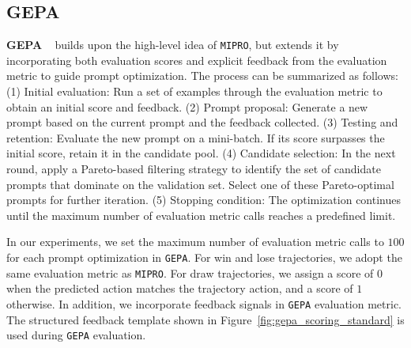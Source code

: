 


\subsection{GEPA} \label{app:baseline:gepa}
\textbf{GEPA} ~\citep{agrawal2025gepa} builds upon the high-level idea of \texttt{MIPRO}, but extends it by incorporating both evaluation scores and explicit feedback from the evaluation metric to guide prompt optimization. The process can be summarized as follows: (1) Initial evaluation: Run a set of examples through the evaluation metric to obtain an initial score and feedback. (2) Prompt proposal: Generate a new prompt based on the current prompt and the feedback collected. (3) Testing and retention: Evaluate the new prompt on a mini-batch. If its score surpasses the initial score, retain it in the candidate pool. (4) Candidate selection: In the next round, apply a Pareto-based filtering strategy to identify the set of candidate prompts that dominate on the validation set. Select one of these Pareto-optimal prompts for further iteration. (5) Stopping condition: The optimization continues until the maximum number of evaluation metric calls reaches a predefined limit. 

In our experiments, we set the maximum number of evaluation metric calls to $100$ for each prompt optimization in \texttt{GEPA}. For win and lose trajectories, we adopt the same evaluation metric as \texttt{MIPRO}. For draw trajectories, we assign a score of $0$ when the predicted action matches the trajectory action, and a score of $1$ otherwise. In addition, we incorporate feedback signals in \texttt{GEPA} evaluation metric. The structured feedback template shown in Figure~\ref{fig:gepa_scoring_standard} is used during \texttt{GEPA} evaluation.



